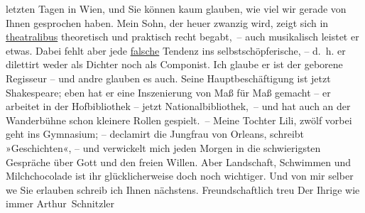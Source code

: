 \begin{ledgroupsized}[t]{13cm}
               letzten Tagen in Wien, und Sie können kaum glauben,
               wie viel wir gerade von Ihnen gesprochen haben. Mein Sohn, der {\pb}heuer zwanzig
               wird, zeigt sich in \uline{theatralibus} theoretisch und
               praktisch recht begabt, – auch musikalisch leistet er etwas. Dabei fehlt aber jede
                  \uline{falsche} Tendenz ins selbstschöpferische, – d. h.
               er dilettirt weder als Dichter noch als Componist. Ich glaube er ist der geborene
               Regisseur – und andre glauben es auch. Seine Hauptbeschäftigung ist jetzt Shakespeare; eben hat er eine Inszenierung von Maß für Maß gemacht – er arbeitet in der Hofbibliothek – jetzt Nationalbibliothek, – und hat auch an der Wanderbühne schon kleinere Rollen gespielt. – Meine Tochter Lili, zwölf vorbei geht ins Gymnasium; – declamirt die Jungfrau von Orleans, schreibt »Geschichten«, – und
               verwickelt mich jeden Morgen in die schwierigsten Gespräche über Gott und \introOben{}den\introOben{} freien Willen. Aber Landschaft, Schwimmen und
               Milchchocolade ist ihr glücklicherweise doch noch wichtiger.\pend
           \pstart
           Und von mir selber we{\geminationn} Sie erlauben schreib ich Ihnen
               nächstens. Freundschaftlich treu\pend
           \pstart Der Ihrige wie immer \spacefill\mbox{Arthur Schnitzler}\pend{}\endnumbering{}\end{ledgroupsized}  \newcommand{\dateiname}{L02376}\newcommand{\titel}{Arthur Schnitzler an Georg Brandes, 30. 1. 1922}\newcommand{\editorInnen}{Martin Anton Müller und Gerd-Hermann Susen}
      